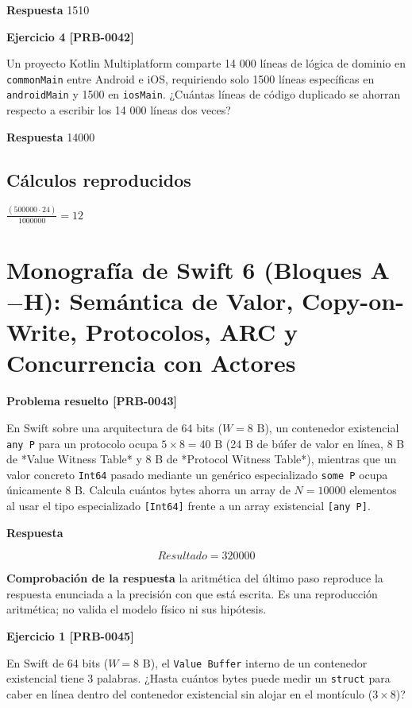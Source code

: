 \documentclass{book}
\begin{document}
\noindent\textbf{Respuesta} 1510

\noindent\textbf{Ejercicio 4 [PRB-0042]}

Un proyecto Kotlin Multiplatform comparte 14 000 líneas de lógica de dominio en \texttt{commonMain} entre Android e iOS, requiriendo solo 1500 líneas específicas en \texttt{androidMain} y 1500 en \texttt{iosMain}. ¿Cuántas líneas de código duplicado se ahorran respecto a escribir los 14 000 líneas dos veces?

\noindent\textbf{Respuesta} 14000

\subsection*{Cálculos reproducidos}

\(\frac{\left(500000\cdot 24\right)}{1000000} = 12\)

\section{Monografía de Swift 6 (Bloques A\(-\)H): Semántica de Valor, Copy-on-Write, Protocolos, ARC y Concurrencia con Actores}

\noindent\textbf{Problema resuelto [PRB-0043]}

En Swift sobre una arquitectura de 64 bits (\(W = 8\text{ B}\)), un contenedor existencial \texttt{any P} para un protocolo ocupa \(5 \times 8 = 40\text{ B}\) (24 B de búfer de valor en línea, 8 B de *Value Witness Table* y 8 B de *Protocol Witness Table*), mientras que un valor concreto \texttt{Int64} pasado mediante un genérico especializado \texttt{some P} ocupa únicamente \(8\text{ B}\). Calcula cuántos bytes ahorra un array de \(N = 10000\) elementos al usar el tipo especializado \texttt{[Int64]} frente a un array existencial \texttt{[any P]}.

\noindent\textbf{Respuesta}

\[
Resultado = 320000
\]

\noindent\textbf{Comprobación de la respuesta} la aritmética del último paso reproduce la respuesta enunciada a la precisión con que está escrita. Es una reproducción aritmética; no valida el modelo físico ni sus hipótesis.

\noindent\textbf{Ejercicio 1 [PRB-0045]}

En Swift de 64 bits (\(W = 8\text{ B}\)), el \texttt{Value Buffer} interno de un contenedor existencial tiene 3 palabras. ¿Hasta cuántos bytes puede medir un \texttt{struct} para caber en línea dentro del contenedor existencial sin alojar en el montículo (\(3 \times 8\))?
\end{document}

